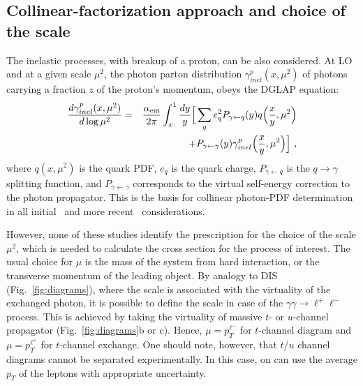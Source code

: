 \subsection{Collinear-factorization approach and choice of the scale}

The inelastic processes, with breakup of a proton, can be also considered.
At LO and at a given scale $\mu^2$, the photon parton distribution $\gamma^p_{inel}(x,\mu^2)$ of photons carrying a fraction $z$ of the proton's momentum, obeys the DGLAP equation:
\begin{eqnarray}
{d \gamma^p_{inel}(x,\mu^2) \over d \log \mu^2} =&& {\alpha_{\rm{em}} \over 2 \pi} \int_x^1 {dy \over y} 
\Big [ \sum_q e_q^2 P_{\gamma \leftarrow q}(y) 
 q \Big({x \over y}, \mu^2 \Big)   \nonumber \\
&&+ P_{\gamma \leftarrow \gamma}(y) \gamma^p_{inel}\Big({x \over y},\mu^2\Big) \Big ]~,
\end{eqnarray}
where $q (x,\mu^2)$ is the quark PDF, $e_q$ is the quark charge, $P_{\gamma \leftarrow q}$ is the $q\rightarrow\gamma$ splitting function, and $P_{\gamma \leftarrow \gamma}$ corresponds to the virtual self-energy correction to the photon propagator.
This is the basis for collinear photon-PDF determination in all initial~\cite{Gluck:2002fi, Martin:2004dh} and more recent~\cite{Ball:2013hta, Martin:2014nqa, Schmidt:2014aba, Harland-Lang:2016kog, Giuli:2017oii, Manohar:2016nzj, Bertone:2017bme} considerations.

However, none of these studies identify the prescription for the choice of the scale $\mu^2$, which is needed to calculate the cross section for the process of interest. 
The usual choice for $\mu$ is the mass of the system from hard interaction, or the transverse momentum of the leading object.
By analogy to DIS (Fig.~\ref{fig:diagrams}), where the scale is associated with the virtuality of the exchanged photon, it is possible to define the scale in case of the $\gamma\gamma\rightarrow\ell^+\ell^-$ process.
This is achieved by taking the virtuality of massive $t$- or $u$-channel propagator (Fig.~\ref{fig:diagrams}b or c).
Hence, $\mu = p_T^{\ell^-}$ for $t$-channel diagram and $\mu = p_T^{\ell^+}$ for $t$-channel exchange.
One should note, however, that $t$/$u$ channel diagrams cannot be separated experimentally. In this case, on can use the average $p_T$ of the leptons with appropriate uncertainty.

